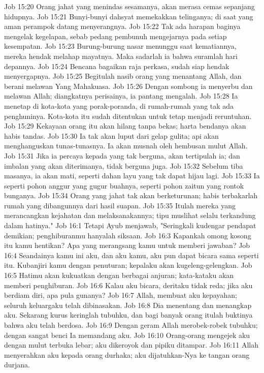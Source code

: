 Job 15:20  Orang jahat yang menindas sesamanya, akan merasa cemas sepanjang hidupnya.
Job 15:21  Bunyi-bunyi dahsyat memekakkan telinganya; di saat yang aman perampok datang menyerangnya.
Job 15:22  Tak ada harapan baginya mengelak kegelapan, sebab pedang pembunuh mengejarnya pada setiap kesempatan.
Job 15:23  Burung-burung nasar menunggu saat kematiannya, mereka hendak melahap mayatnya. Maka sadarlah ia bahwa suramlah hari depannya.
Job 15:24  Bencana bagaikan raja perkasa, sudah siap hendak menyergapnya.
Job 15:25  Begitulah nasib orang yang menantang Allah, dan berani melawan Yang Mahakuasa.
Job 15:26  Dengan sombong ia menyerbu dan melawan Allah; diangkatnya perisainya, ia pantang mengalah.
Job 15:28  Ia menetap di kota-kota yang porak-poranda, di rumah-rumah yang tak ada penghuninya. Kota-kota itu sudah ditentukan untuk tetap menjadi reruntuhan.
Job 15:29  Kekayaan orang itu akan hilang tanpa bekas; harta bendanya akan habis tandas.
Job 15:30  Ia tak akan luput dari gelap gulita; api akan menghanguskan tunas-tunasnya. Ia akan musnah oleh hembusan mulut Allah.
Job 15:31  Jika ia percaya kepada yang tak berguna, akan tertipulah ia; dan imbalan yang akan diterimanya, tidak berguna juga.
Job 15:32  Sebelum tiba masanya, ia akan mati, seperti dahan layu yang tak dapat hijau lagi.
Job 15:33  Ia seperti pohon anggur yang gugur buahnya, seperti pohon zaitun yang rontok bunganya.
Job 15:34  Orang yang jahat tak akan berketurunan; habis terbakarlah rumah yang dibangunnya dari hasil suapan.
Job 15:35  Itulah mereka yang merancangkan kejahatan dan melaksanakannya; tipu muslihat selalu terkandung dalam hatinya."
Job 16:1  Tetapi Ayub menjawab, "Seringkali kudengar pendapat demikian; penghiburanmu hanyalah siksaan.
Job 16:3  Kapankah omong kosong itu kamu hentikan? Apa yang merangsang kamu untuk memberi jawaban?
Job 16:4  Seandainya kamu ini aku, dan aku kamu, aku pun dapat bicara sama seperti itu. Kubanjiri kamu dengan penuturan; kepalaku akan kugeleng-gelengkan.
Job 16:5  Hatimu akan kukuatkan dengan berbagai anjuran; kata-kataku akan memberi penghiburan.
Job 16:6  Kalau aku bicara, deritaku tidak reda; jika aku berdiam diri, apa pula gunanya?
Job 16:7  Allah, membuat aku kepayahan; seluruh keluargaku telah dibinasakan.
Job 16:8  Dia menentang dan menangkap aku. Sekarang kurus keringlah tubuhku, dan bagi banyak orang itulah buktinya bahwa aku telah berdosa.
Job 16:9  Dengan geram Allah merobek-robek tubuhku; dengan sangat benci Ia memandang aku.
Job 16:10  Orang-orang mengejek aku dengan mulut terbuka lebar; aku dikeroyok dan pipiku ditampar.
Job 16:11  Allah menyerahkan aku kepada orang durhaka; aku dijatuhkan-Nya ke tangan orang durjana.
